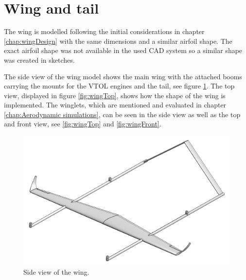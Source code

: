 \documentclass[english,fira]{ist-report}
\begin{document}
\section{Wing and tail}

The wing is modelled following the initial considerations in chapter \ref{chap:wingDesign} with the same dimensions and a similar airfoil shape. The exact airfoil shape was not available in the used CAD system so a similar shape was created in sketches.

The side view of the wing model shows the main wing with the attached booms carrying the mounts for the VTOL engines and the tail, see figure \ref{fig:wingSide}. The top view, displayed in figure \ref{fig:wingTop}, shows how the shape of the wing is implemented. The winglets, which are mentioned and evaluated in chapter \ref{chap:Aerodynamic simulations}, can be seen in the side view as well as the top and front view, see \ref{fig:wingTop} and \ref{fig:wingFront}.

\begin{figure}[ht]
	\centering
	\includegraphics[width = \linewidth]{graphics/cad/wingSide.png}
	\caption{Side view of the wing.}
	\label{fig:wingSide}
\end{figure}
\end{document}
